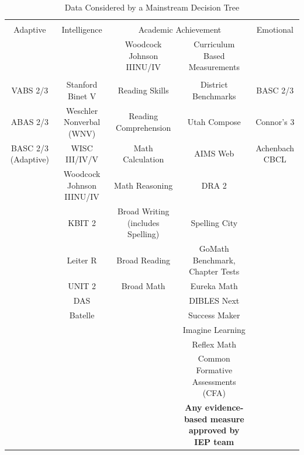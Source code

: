 \documentclass[twoside]{article}
\begin{document}
%
%
%
\begin{table}[tbp]
\centering
\vspace*{0cm}\caption{Data Considered by a Mainstream Decision Tree}
\label{tab1}
\resizebox{\textwidth}{!}
{\begin{tabular}{ccccc}
\hline\\[-1.5ex]
Adaptive & Intelligence & \multicolumn{2}{c}{Academic Achievement} & Emotional \\[0.5ex]
\cmidrule(lr){3-4}
 & & Woodcock Johnson IIINU/IV & Curriculum Based Measurements & \\
\hline\\[-1.5ex]
VABS 2/3 & Stanford Binet V & Reading Skills & District Benchmarks & BASC 2/3\\
ABAS 2/3 & Weschler Nonverbal (WNV) & Reading Comprehension & Utah Compose & Connor's 3\\
BASC 2/3 (Adaptive) & WISC III/IV/V & Math Calculation & AIMS Web & Achenbach CBCL\\
 & Woodcock Johnson IIINU/IV & Math Reasoning & DRA 2 & \\
 & KBIT 2 & Broad Writing (includes Spelling) & Spelling City & \\
 & Leiter R & Broad Reading & GoMath Benchmark, Chapter Tests & \\
 & UNIT 2 & Broad Math & Eureka Math &\\
 & DAS & & DIBLES Next &\\
 & Batelle & & Success Maker &\\
 & & & Imagine Learning &\\
 & & & Reflex Math &\\
 & & & Common Formative Assessments (CFA) &\\
 & & & \textbf{Any evidence-based measure approved by IEP team} &\\
\hline
\end{tabular}}
\end{table}
%
%
%
%
%
%
%
\end{document}
